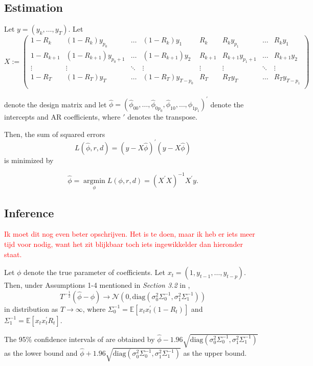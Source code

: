 \documentclass{article}
\newcommand{\E}{\mathbb{E}}
\DeclareMathOperator*{\argmin}{argmin}
\begin{document}
\subsection{Estimation} \label{app:estimation}
Let $y = (y_k, \dots, y_T)$.
Let
$$X := \begin{pmatrix}
1 - R_k & (1 - R_k) y_{p_0} &  \dots & (1 - R_k) y_1 &
R_k & R_k y_{p_1} & \dots & R_k y_1 \\
1 - R_{k+1} & (1 - R_{k+1}) y_{p_0+1} & \dots & (1 - R_{k+1}) y_2 &
R_{k+1} & R_{k+1} y_{p_1+1} & \dots & R_{k+1} y_2 \\
\vdots & \vdots & \ddots & \vdots & 
\vdots & \vdots & \ddots & \vdots \\
1 - R_T & (1 - R_T) y_T & \dots & (1 - R_T) y_{T-p_0} &
R_T & R_T y_T & \dots & R_T y_{T-p_1} \\
\end{pmatrix}$$

denote the design matrix and let
$\hat{\phi} = (\hat{\phi}_{00}, \dots, \hat{\phi}_{0 p_0}, \hat{\phi}_{10}, \dots, \hat{\phi}_{1 p_1})^\prime$
denote the intercepts and AR coefficients, where $\prime$ denotes the transpose.

Then, the sum of squared errors 
$$L(\hat{\phi}, r, d) = (y - X \hat{\phi})^\prime (y - X \hat{\phi})$$
is minimized by

$$\hat{\phi} = \argmin\limits_{\phi} L(\phi, r, d) = 
(X^\prime X)^{-1} X^\prime y.$$

\subsection{Inference} \label{app:inference}
\textcolor{red}{Ik moet dit nog even beter opschrijven. Het is te doen, maar ik heb er iets meer tijd voor nodig, want het zit blijkbaar toch iets ingewikkelder dan hieronder staat.}

Let $\phi$ denote the true parameter of coefficients. Let $x_t = (1, y_{t-1}, \dots, y_{t-p})$.
Then, under Assumptions 1-4 mentioned in \textit{Section 3.2} in \citet{bar2}, 
$$T^{-\frac{1}{2}} (\hat{\phi} - \phi) \rightarrow \mathcal{N} \left( 0, \mathrm{diag}(\sigma_0^2 \Sigma_0^{-1}, \sigma_1^2 \Sigma_1^{-1}) \right)$$
in distribution as $T \rightarrow \infty$, where
$\Sigma_0^{-1} = \E[x_t x_t^\prime (1-R_t)]$ and 
$\Sigma_1^{-1} = \E[x_t x_t^\prime R_t].$

The 95\% confidence intervals of are obtained by
$\hat{\phi} - 1.96 \sqrt{\mathrm{diag}(\sigma_0^2 \Sigma_0^{-1}, \sigma_1^2 \Sigma_1^{-1})}$ as the lower bound and 
$\hat{\phi} + 1.96 \sqrt{\mathrm{diag}(\sigma_0^2 \Sigma_0^{-1}, \sigma_1^2 \Sigma_1^{-1})}$ as the upper bound.
\end{document}
